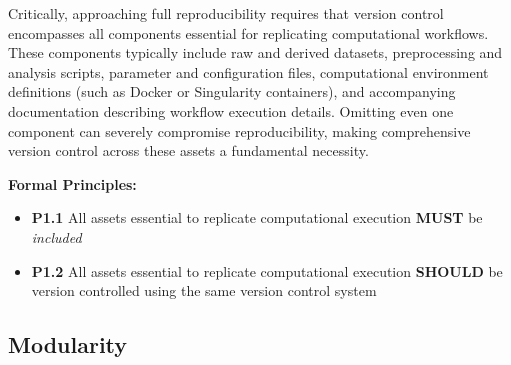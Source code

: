 \documentclass{article}
\begin{document}
Critically, approaching full reproducibility requires that version control encompasses all components essential for replicating computational workflows.
These components typically include raw and derived datasets, preprocessing and analysis scripts, parameter and configuration files, computational environment definitions (such as Docker or Singularity containers), and accompanying documentation describing workflow execution details.
Omitting even one component can severely compromise reproducibility, making comprehensive version control across these assets a fundamental necessity.

\textbf{Formal Principles:}
\begin{itemize}
    \item \textbf{P1.1} All assets essential to replicate computational execution \textbf{MUST} be \emph{included}
    \item \textbf{P1.2} All assets essential to replicate computational execution \textbf{SHOULD} be version controlled using the same version control system
\end{itemize}


\subsection{Modularity}
\end{document}
